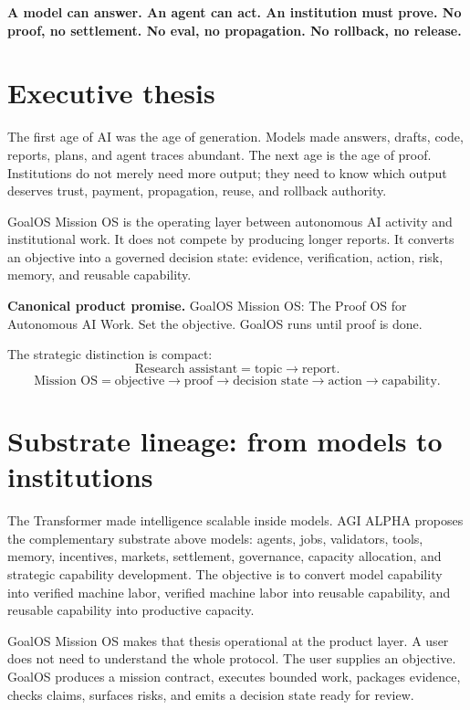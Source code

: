 \documentclass[11pt]{article}
\newcommand{\softlaw}[1]{\begin{mintbox}\textbf{#1}\end{mintbox}}
\begin{document}
\softlaw{A model can answer. An agent can act. An institution must prove. No proof, no settlement. No eval, no propagation. No rollback, no release.}

\tableofcontents
\newpage

\section{Executive thesis}
The first age of AI was the age of generation. Models made answers, drafts, code, reports, plans, and agent traces abundant. The next age is the age of proof. Institutions do not merely need more output; they need to know which output deserves trust, payment, propagation, reuse, and rollback authority.

GoalOS Mission OS is the operating layer between autonomous AI activity and institutional work. It does not compete by producing longer reports. It converts an objective into a governed decision state: evidence, verification, action, risk, memory, and reusable capability.

\begin{goldbox}
\textbf{Canonical product promise.} GoalOS Mission OS: The Proof OS for Autonomous AI Work. Set the objective. GoalOS runs until proof is done.
\end{goldbox}

The strategic distinction is compact:
\[
\text{Research assistant}=\text{topic}\rightarrow\text{report}.
\]
\[
\text{Mission OS}=\text{objective}\rightarrow\text{proof}\rightarrow\text{decision state}\rightarrow\text{action}\rightarrow\text{capability}.
\]

\section{Substrate lineage: from models to institutions}
The Transformer made intelligence scalable inside models. AGI ALPHA proposes the complementary substrate above models: agents, jobs, validators, tools, memory, incentives, markets, settlement, governance, capacity allocation, and strategic capability development. The objective is to convert model capability into verified machine labor, verified machine labor into reusable capability, and reusable capability into productive capacity.

GoalOS Mission OS makes that thesis operational at the product layer. A user does not need to understand the whole protocol. The user supplies an objective. GoalOS produces a mission contract, executes bounded work, packages evidence, checks claims, surfaces risks, and emits a decision state ready for review.
\end{document}
